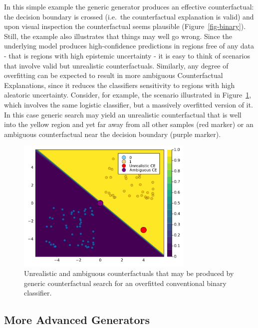 \documentclass[
  letterpaper,
  DIV=11,
  numbers=noendperiod]{scrartcl}
\begin{document}
In this simple example the generic generator produces an effective
counterfactual: the decision boundary is crossed (i.e.~the
counterfactual explanation is valid) and upon visual inspection the
counterfactual seems plausible (Figure~\ref{fig-binary}). Still, the
example also illustrates that things may well go wrong. Since the
underlying model produces high-confidence predictions in regions free of
any data - that is regions with high epistemic uncertainty - it is easy
to think of scenarios that involve valid but unrealistic
counterfactuals. Similarly, any degree of overfitting can be expected to
result in more ambiguous Counterfactual Explanations, since it reduces
the classifiers sensitivity to regions with high aleatoric uncertainty.
Consider, for example, the scenario illustrated in
Figure~\ref{fig-binary-wrong}, which involves the same logistic
classifier, but a massively overfitted version of it. In this case
generic search may yield an unrealistic counterfactual that is well into
the yellow region and yet far away from all other samples (red marker)
or an ambiguous counterfactual near the decision boundary (purple
marker).

\begin{figure}

{\centering \includegraphics[width=3.33333in,height=2.5in]{www/binary_wrong.png}

}

\caption{\label{fig-binary-wrong}Unrealistic and ambiguous
counterfactuals that may be produced by generic counterfactual search
for an overfitted conventional binary classifier.}

\end{figure}

\hypertarget{more-advanced-generators}{%
\subsection{More Advanced Generators}\label{more-advanced-generators}}
\end{document}
